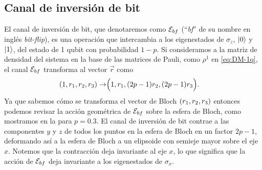 \subsection{Canal de inversión de bit} %
El canal de inversión de bit, que denotaremos como $\mathcal{E}_{bf}$ (``\textit{bf}'' de su 
nombre en inglés \textit{bit-flip}), es una operación que 
intercambia a los eigenestados de $\sigma_z$, $\ket{0}$ y $\ket{1}$,
del estado de 1 qubit con probabilidad $1-p$. Si consideramos a 
la matriz de densidad del sistema en la base de las matrices de 
Pauli, como $\rho^1$ en \eqref{eq:DM-1q}, el canal $\mathcal{E}_{bf}$ 
transforma  al vector $\vec{r}$ como \cite{nielsen_chuang_2011}
\begin{align}
\qty(1,r_1,r_2,r_3)\rightarrow&\Big(1,r_1,\qty(2p-1)r_2,\qty(2p-1)r_3\Big).
\label{eq:bit-flip-BlochVec}
\end{align}
Ya que sabemos cómo se transforma el vector de Bloch $\qty(r_1,r_2,r_3)$
entonces podemos revisar la acción geométrica de $\mathcal{E}_{bf}$ sobre 
la esfera de Bloch, como mostramos en la  para $p=0.3$.
El canal de inversión de bit contrae a las componentes $y$ y $z$ de 
todos los puntos en la esfera de Bloch en un factor $2p-1$, deformando
así a la esfera de Bloch a un elipsoide con semieje mayor sobre el eje $x$.
Notemos que la contracción deja invariante al eje $x$, lo que significa
que la acción de $\mathcal{E}_{bf}$ deja invariante a los eigenestados
de $\sigma_x$.

